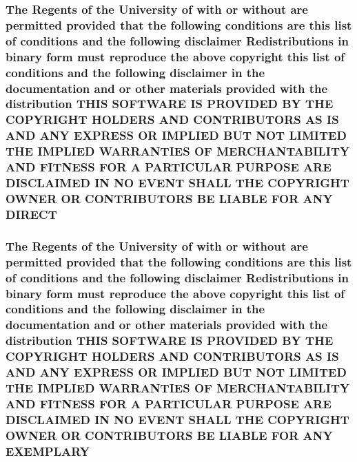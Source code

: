 \hypertarget{_l_i_c_e_n_s_e_a0407274df7e8d8cf644f33c63ca8f977}{
\subsubsection[{D\+I\+R\+E\+C\+T}]{\setlength{\rightskip}{0pt plus 5cm}The Regents of the University of with or without are permitted provided that the following conditions are this list of conditions and the following disclaimer Redistributions in binary form must reproduce the above copyright this list of conditions and the following disclaimer in the documentation and or other materials provided with the distribution T\+H\+I\+S S\+O\+F\+T\+W\+A\+R\+E I\+S P\+R\+O\+V\+I\+D\+E\+D B\+Y T\+H\+E C\+O\+P\+Y\+R\+I\+G\+H\+T H\+O\+L\+D\+E\+R\+S A\+N\+D C\+O\+N\+T\+R\+I\+B\+U\+T\+O\+R\+S A\+S I\+S A\+N\+D A\+N\+Y E\+X\+P\+R\+E\+S\+S O\+R I\+M\+P\+L\+I\+E\+D B\+U\+T N\+O\+T L\+I\+M\+I\+T\+E\+D T\+H\+E I\+M\+P\+L\+I\+E\+D {\bf W\+A\+R\+R\+A\+N\+T\+I\+E\+S} O\+F M\+E\+R\+C\+H\+A\+N\+T\+A\+B\+I\+L\+I\+T\+Y A\+N\+D F\+I\+T\+N\+E\+S\+S F\+O\+R A P\+A\+R\+T\+I\+C\+U\+L\+A\+R P\+U\+R\+P\+O\+S\+E A\+R\+E D\+I\+S\+C\+L\+A\+I\+M\+E\+D I\+N N\+O E\+V\+E\+N\+T S\+H\+A\+L\+L T\+H\+E C\+O\+P\+Y\+R\+I\+G\+H\+T O\+W\+N\+E\+R O\+R C\+O\+N\+T\+R\+I\+B\+U\+T\+O\+R\+S B\+E L\+I\+A\+B\+L\+E F\+O\+R A\+N\+Y D\+I\+R\+E\+C\+T}}\label{_l_i_c_e_n_s_e_a0407274df7e8d8cf644f33c63ca8f977}
\hypertarget{_l_i_c_e_n_s_e_aa78b67dcb774d1c903a69fc502d9486e}{
\subsubsection[{E\+X\+E\+M\+P\+L\+A\+R\+Y}]{\setlength{\rightskip}{0pt plus 5cm}The Regents of the University of with or without are permitted provided that the following conditions are this list of conditions and the following disclaimer Redistributions in binary form must reproduce the above copyright this list of conditions and the following disclaimer in the documentation and or other materials provided with the distribution T\+H\+I\+S S\+O\+F\+T\+W\+A\+R\+E I\+S P\+R\+O\+V\+I\+D\+E\+D B\+Y T\+H\+E C\+O\+P\+Y\+R\+I\+G\+H\+T H\+O\+L\+D\+E\+R\+S A\+N\+D C\+O\+N\+T\+R\+I\+B\+U\+T\+O\+R\+S A\+S I\+S A\+N\+D A\+N\+Y E\+X\+P\+R\+E\+S\+S O\+R I\+M\+P\+L\+I\+E\+D B\+U\+T N\+O\+T L\+I\+M\+I\+T\+E\+D T\+H\+E I\+M\+P\+L\+I\+E\+D {\bf W\+A\+R\+R\+A\+N\+T\+I\+E\+S} O\+F M\+E\+R\+C\+H\+A\+N\+T\+A\+B\+I\+L\+I\+T\+Y A\+N\+D F\+I\+T\+N\+E\+S\+S F\+O\+R A P\+A\+R\+T\+I\+C\+U\+L\+A\+R P\+U\+R\+P\+O\+S\+E A\+R\+E D\+I\+S\+C\+L\+A\+I\+M\+E\+D I\+N N\+O E\+V\+E\+N\+T S\+H\+A\+L\+L T\+H\+E C\+O\+P\+Y\+R\+I\+G\+H\+T O\+W\+N\+E\+R O\+R C\+O\+N\+T\+R\+I\+B\+U\+T\+O\+R\+S B\+E L\+I\+A\+B\+L\+E F\+O\+R A\+N\+Y E\+X\+E\+M\+P\+L\+A\+R\+Y}}\label{_l_i_c_e_n_s_e_aa78b67dcb774d1c903a69fc502d9486e}
